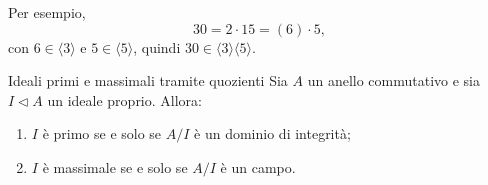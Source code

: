 \documentclass[a4paper]{article}
\begin{document}
\begin{radioactive}
Per esempio,
\[
    30=2\cdot 15=(6)\cdot 5,
\]
con \(6\in\langle 3 \rangle\) e \(5\in\langle 5 \rangle\), quindi \(30\in\langle 3 \rangle\langle 5 \rangle\).
\end{radioactive}

\pagebreak

\begin{radioactive}
\begin{snippetproposition}{Ideali primi e massimali tramite quozienti}
    Sia \(A\) un anello commutativo e sia \(I\triangleleft A\) un ideale proprio. Allora:
    \begin{enumerate}
        \item \(I\) è primo se e solo se \(A/I\) è un dominio di integrità;
        \item \(I\) è massimale se e solo se \(A/I\) è un campo.
    \end{enumerate}
\end{snippetproposition}
\end{radioactive}
\end{document}
